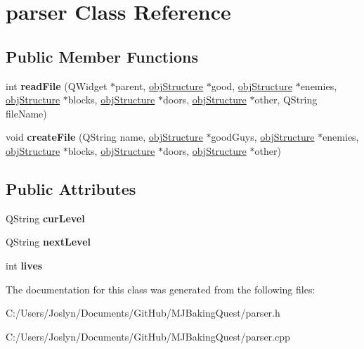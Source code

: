 \hypertarget{classparser}{\section{parser Class Reference}
\label{classparser}
}
\subsection*{Public Member Functions}
\begin{DoxyCompactItemize}
\item 
\hypertarget{classparser_aa16938ad5757d700376a6fadb4e11e2a}{int {\bfseries read\-File} (Q\-Widget $\ast$parent, \hyperlink{classobj_structure}{obj\-Structure} $\ast$good, \hyperlink{classobj_structure}{obj\-Structure} $\ast$enemies, \hyperlink{classobj_structure}{obj\-Structure} $\ast$blocks, \hyperlink{classobj_structure}{obj\-Structure} $\ast$doors, \hyperlink{classobj_structure}{obj\-Structure} $\ast$other, Q\-String file\-Name)}\label{classparser_aa16938ad5757d700376a6fadb4e11e2a}

\item 
\hypertarget{classparser_ace9c694c314e8314bcee42ca751f64a0}{void {\bfseries create\-File} (Q\-String name, \hyperlink{classobj_structure}{obj\-Structure} $\ast$good\-Guys, \hyperlink{classobj_structure}{obj\-Structure} $\ast$enemies, \hyperlink{classobj_structure}{obj\-Structure} $\ast$blocks, \hyperlink{classobj_structure}{obj\-Structure} $\ast$doors, \hyperlink{classobj_structure}{obj\-Structure} $\ast$other)}\label{classparser_ace9c694c314e8314bcee42ca751f64a0}

\end{DoxyCompactItemize}
\subsection*{Public Attributes}
\begin{DoxyCompactItemize}
\item 
\hypertarget{classparser_a60fba17300bd869e168287358a620fc2}{Q\-String {\bfseries cur\-Level}}\label{classparser_a60fba17300bd869e168287358a620fc2}

\item 
\hypertarget{classparser_aded4d171590ab8bc5ff16d28349e72c5}{Q\-String {\bfseries next\-Level}}\label{classparser_aded4d171590ab8bc5ff16d28349e72c5}

\item 
\hypertarget{classparser_a700ed3fe73034eb63ed69dd40f3de7b1}{int {\bfseries lives}}\label{classparser_a700ed3fe73034eb63ed69dd40f3de7b1}

\end{DoxyCompactItemize}


The documentation for this class was generated from the following files\-:\begin{DoxyCompactItemize}
\item 
C\-:/\-Users/\-Joslyn/\-Documents/\-Git\-Hub/\-M\-J\-Baking\-Quest/parser.\-h\item 
C\-:/\-Users/\-Joslyn/\-Documents/\-Git\-Hub/\-M\-J\-Baking\-Quest/parser.\-cpp\end{DoxyCompactItemize}
